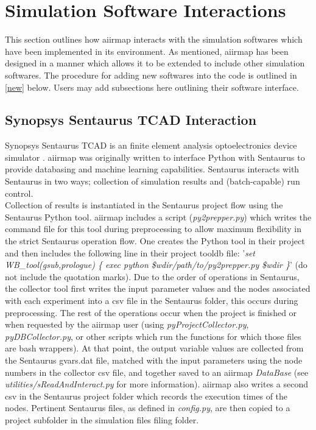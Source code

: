 \documentclass[a4paper,12pt,english]{article}
\begin{document}
    \section{Simulation Software Interactions} \label{softwares}
    This section outlines how aiirmap interacts with the simulation softwares which have been implemented in its environment. As mentioned, aiirmap has been designed in a manner which allows it to be extended to include other simulation softwares.  The procedure for adding new softwares into the code is outlined in \autoref{new} below. Users may add subsections here outlining their software interface. \\
    
    \subsection{Synopsys Sentaurus TCAD Interaction} \label{tcad}
    Synopsys Sentaurus TCAD is an finite element analysis optoelectronics device simulator \cite{tcad}. aiirmap was originally written to interface Python with Sentaurus to provide databasing and machine learning capabilities. Sentaurus interacts with Sentaurus in two ways; collection of simulation results and (batch-capable) run control. \\

    Collection of results is instantiated in the Sentaurus project flow using the Sentaurus Python tool. aiirmap includes a script (\textit{py2prepper.py}) which writes the command file for this tool during preprocessing to allow maximum flexibility in the strict Sentaurus operation flow. One creates the Python tool in their project and then includes the following line in their project tooldb file: '\textit{set WB\_tool(gsub,prologue) \{ exec  python \$wdir/path/to/py2prepper.py \$wdir \}}' (do not include the quotation marks). Due to the order of operations in Sentaurus, the collector tool first writes the input parameter values and the nodes associated with each experiment into a csv file in the Sentaurus folder, this occurs during preprocessing. The rest of the operations occur when the project is finished or when requested by the aiirmap user (using \textit{pyProjectCollector.py}, \textit{pyDBCollector.py}, or other scripts which run the functions for which those files are bash wrappers). At that point, the output variable values are collected from the Sentaurus gvars.dat file, matched with the input parameters using the node numbers in the collector csv file, and together saved to an aiirmap \textit{DataBase} (see \textit{utilities/sReadAndInteract.py} for more information). aiirmap also writes a second csv in the Sentaurus project folder which records the execution times of the nodes. Pertinent Sentaurus files, as defined in \textit{config.py}, are then copied to a project subfolder in the simulation files filing folder.  \\
    
\end{document}
